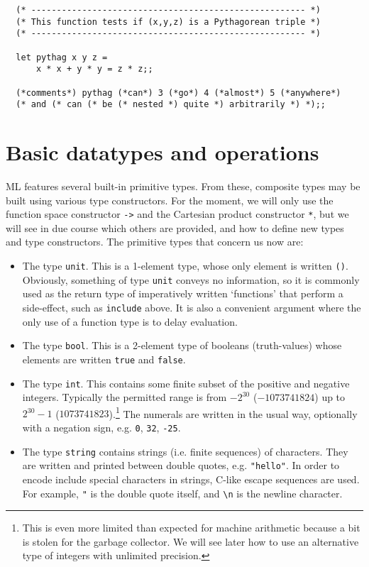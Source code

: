 \begin{boxed}\begin{lstlisting}
  (* ------------------------------------------------------ *)
  (* This function tests if (x,y,z) is a Pythagorean triple *)
  (* ------------------------------------------------------ *)

  let pythag x y z =
      x * x + y * y = z * z;;

  (*comments*) pythag (*can*) 3 (*go*) 4 (*almost*) 5 (*anywhere*)
  (* and (* can (* be (* nested *) quite *) arbitrarily *) *);;
\end{lstlisting}\end{boxed}

\section{Basic datatypes and operations}

ML features several built-in primitive types. From these, composite types may
be built using various type constructors. For the moment, we will only use the
function space constructor {\verb+->+} and the Cartesian product constructor
{\verb+*+}, but we will see in due course which others are provided, and how to
define new types and type constructors. The primitive types that concern us now
are:

\begin{itemize}

\item The type {\tt unit}. This is a 1-element type, whose only element is
written {\tt ()}. Obviously, something of type {\tt unit} conveys no
information, so it is commonly used as the return type of imperatively written
`functions' that perform a side-effect, such as {\tt include} above. It is also
a convenient argument where the only use of a function type is to delay
evaluation.

\item The type {\tt bool}. This is a 2-element type of booleans (truth-values)
whose elements are written {\tt true} and {\tt false}.

\item The type {\tt int}. This contains some finite subset of the positive and
negative integers. Typically the permitted range is from $-2^{30}$
($-1073741824$) up to $2^{30}-1$ ($1073741823$).\footnote{This is even more
limited than expected for machine arithmetic because a bit is stolen for the
garbage collector. We will see later how to use an alternative type of integers
with unlimited precision.} The numerals are written in the usual way,
optionally with a negation sign, e.g. {\tt 0}, {\tt 32}, {\tt -25}.

\item The type {\tt string} contains strings (i.e. finite sequences) of
characters. They are written and printed between double quotes,
e.g. \lstinline!"hello"!. In order to encode include special characters in strings, C-like
escape sequences are used. For example, \lstinline!"! is the double quote itself,
and {\verb+\n+} is the newline character.

\end{itemize}

